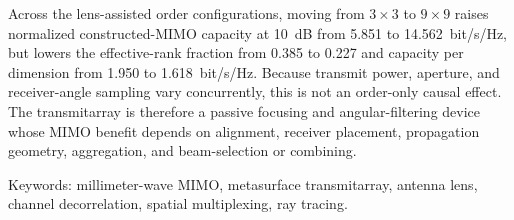 \documentclass[12pt, twoside, openright]{book}
\begin{document}
Across the lens-assisted order configurations, moving from $3\times3$ to $9\times9$ raises normalized constructed-MIMO capacity at 10~dB from 5.851 to 14.562~bit/s/Hz, but lowers the effective-rank fraction from 0.385 to 0.227 and capacity per dimension from 1.950 to 1.618~bit/s/Hz. Because transmit power, aperture, and receiver-angle sampling vary concurrently, this is not an order-only causal effect. The transmitarray is therefore a passive focusing and angular-filtering device whose MIMO benefit depends on alignment, receiver placement, propagation geometry, aggregation, and beam-selection or combining.


\noindent Keywords: millimeter-wave MIMO, metasurface transmitarray, antenna lens, channel decorrelation, spatial multiplexing, ray tracing.
\endgroup
\newpage




\tableofcontents
\newpage




\listoffigures
\newpage




\listoftables
\newpage




\mainmatter



% 
% 
% 
% 
% 
% 

% 
% 
% 
% 
% 


% 
% 
% 
% 
\end{document}
